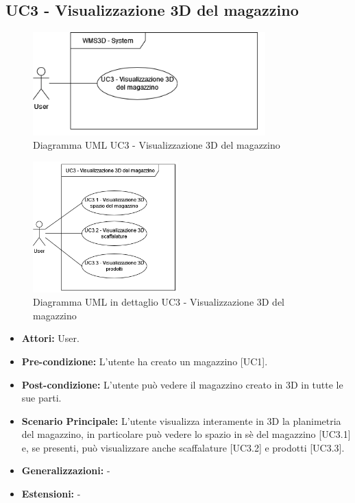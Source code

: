 \subsection{UC3 - Visualizzazione 3D del magazzino}
\begin{figure}[H]
  \centering
  \includegraphics[width=0.8\textwidth]{UC_diagrams_1-10/UC3_sys.drawio.png}
   \caption{Diagramma UML UC3 - Visualizzazione 3D del magazzino}
\end{figure}
\begin{figure}[H]
  \centering
  \includegraphics[width=0.5\textwidth]{UC_diagrams_1-10/UC3.drawio.png}
   \caption{Diagramma UML in dettaglio UC3 - Visualizzazione 3D del magazzino}
\end{figure}
\begin{itemize}
    \item \textbf{Attori:} User.
    \item \textbf{Pre-condizione:}  L'utente ha creato un magazzino [UC1].
    \item \textbf{Post-condizione:} L'utente può vedere il magazzino creato in 3D in tutte le sue parti.
    \item \textbf{Scenario Principale:}  L'utente visualizza interamente in 3D la planimetria del magazzino, in particolare può vedere lo spazio in sè del magazzino [UC3.1] e, se presenti, può visualizzare anche scaffalature [UC3.2] e prodotti [UC3.3].
    \item \textbf{Generalizzazioni:} -
    \item \textbf{Estensioni:} -
\end{itemize}


